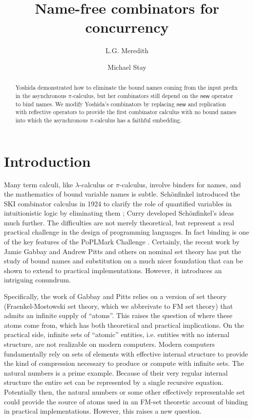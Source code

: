\documentclass{llncs}
\title{Name-free combinators for concurrency}
\author{
L.G. Meredith\inst{1}\\
\and
Michael Stay\inst{2}\\
}
\institute{
  {RChain Cooperative}\\
  \email{\fontsize{8}{8}\selectfont greg@rchain.coop}
  \and
  {Pyrofex Corp.}\\
  \email{\fontsize{8}{8}\selectfont stay@pyrofex.net}\\
}
\newcommand{\new}{\mathsf{new}}
\newcommand{\pic}{$\pi$-calculus}
\begin{document}
\maketitle
\begin{abstract}
\noindent
  Yoshida demonstrated how to eliminate the bound names coming from
  the input prefix in the asynchronous {\pic}, but her combinators
  still depend on the $\new$ operator to bind names.
  We modify Yoshida's combinators by replacing $\new$ and replication
  with reflective operators to provide the first combinator calculus
  with no bound names into which the asynchronous {\pic} has a faithful
  embedding.  
\end{abstract}

\section{Introduction}

Many term calculi, like $\lambda$-calculus or {\pic}, involve binders
for names, and the mathematics of bound variable names is
subtle. Sch\"onfinkel introduced the SKI combinator calculus in 1924
to clarify the role of quantified variables in intuitionistic logic by
eliminating them \cite{finkel}; Curry developed Sch\"onfinkel's ideas
much further. The difficulties are not merely theoretical, but
represent a real practical challenge in the design of programming
languages. In fact binding is one of the key features of
the PoPLMark Challenge \cite{PoPLMark}. Certainly, the recent work by Jamie
Gabbay and Andrew Pitts \cite{DBLP:journals/fac/GabbayP02} and others
\cite{DBLP:journals/jcss/Clouston14} on nominal set theory has put the
study of bound names and substitution on a much nicer foundation that
can be shown to extend to practical implementations. However, it
introduces an intriguing conundrum.

Specifically, the work of Gabbay and Pitts relies on a version of set
theory (Fraenkel-Mostowski set theory, which we abbreivate to FM set
theory) that admits an infinite supply of ``atoms''. This raises the
question of where these atoms come from, which has both theoretical
and practical implications. On the practical side, infinite sets of
``atomic'' entities, i.e. entities with no internal structure, are not
realizable on modern computers. Modern computers fundamentally rely on
sets of elements with effective internal structure to provide the kind
of compression necessary to produce or compute with infinite sets. The
natural numbers is a prime example. Because of their very regular
internal structure the entire set can be represented by a single
recursive equation. Potentially then, the natural numbers or some
other effectively representable set could provide the source of atoms
used in an FM-set theoretic account of binding in practical
implementations. However, this raises a new question.
\end{document}
